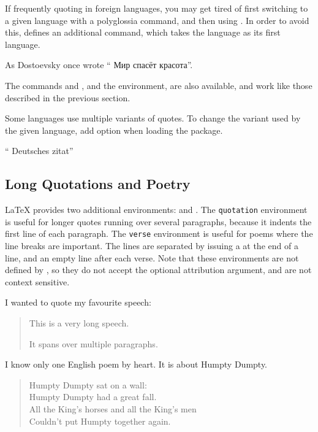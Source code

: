 If frequently quoting in foreign languages, you may get tired of first
switching to a given language with a polyglossia command, and then using
. In order to avoid this,  defines an additional
 command, which takes the language as its first language.
\begingroup
\setmonofont{cmuntt.otf}
\begin{example}
As Dostoevsky once wrote
\foreignquote{russian}{%
  Мир спасёт красота}.
\end{example}
\endgroup
The commands  and , and the
environment, are also available, and work like those
described in the previous section.

Some languages use multiple variants of quotes. To change the variant
used by the given language, add option 
when loading the  package.
\begin{example}
\usepackage[
  autostyle,
  german=guillemets,
]{csquotes}

\foreignquote{german}{%
  Deutsches zitat}
\end{example}

\subsection{Long Quotations and Poetry}
\LaTeX{} provides two additional environments:  and .
The \texttt{quotation} environment is useful for
longer quotes running over several paragraphs, because it indents the first line
of each paragraph. The \texttt{verse} environment is useful for poems where the
line breaks are important. The lines are separated by issuing a \csi{\bs} at the
end of a line, and an empty line after each verse. Note that these environments
are not defined by , so they do not accept the optional
attribution argument, and are not context sensitive.

\begin{example}
I wanted to quote my
favourite speech:
\begin{quotation}
  This is a very
  long speech.

  It spans over multiple
  paragraphs.
\end{quotation}
\end{example}

\begin{example}
I know only one English
poem by heart. It is
about Humpty Dumpty.
\begin{verse}
  Humpty Dumpty sat
  on a wall:\\
  Humpty Dumpty had
  a great fall.\\
  All the King's horses
  and all the King's men\\
  Couldn't put Humpty
  together again.
\end{verse}
\end{example}

